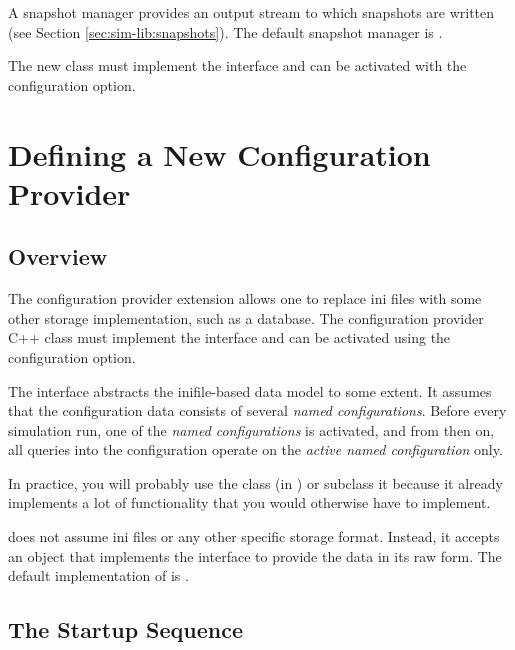 A snapshot manager provides an output stream to which snapshots are written
(see Section \ref{sec:sim-lib:snapshots}). The default snapshot manager
is .

The new class must implement the  interface and
can be activated with the  configuration
option.


\section{Defining a New Configuration Provider}
\label{sec:plugin-exts:configuration-providers}

\subsection{Overview}
\label{sec:plugin-exts:configprovider-overview}

The configuration provider extension allows one to replace ini files
with some other storage implementation, such as a database.
The configuration provider C++ class must implement the
 interface and can be activated using
the  configuration option.

The  interface abstracts the inifile-based
data model to some extent. It assumes that the configuration data
consists of several \textit{named configurations}. Before every
simulation run, one of the \textit{named configurations} is
activated, and from then on, all queries into the configuration
operate on the \textit{active named configuration} only.

In practice, you will probably use the 
class (in ) or subclass it because it already
implements a lot of functionality that you would otherwise have to implement.

 does not assume ini files or
any other specific storage format. Instead, it accepts an object
that implements the 
interface to provide the data in its raw form.
The default implementation of  is
.

\subsection{The Startup Sequence}
\label{sec:plugin-exts:configprovider-startup-sequence}


